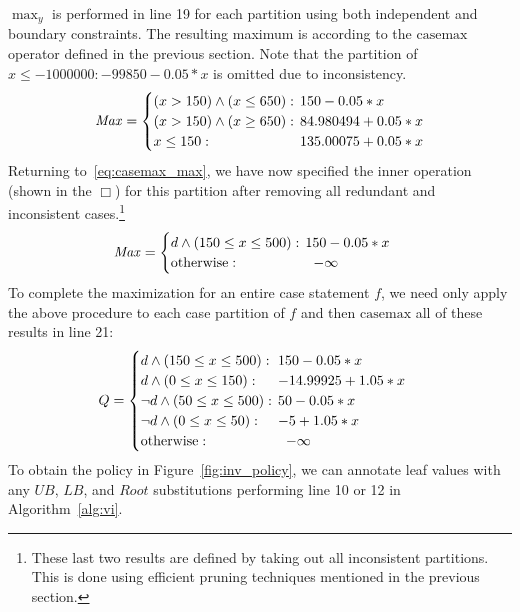 \documentclass[twoside,11pt]{article}
\newcommand{\casemax}{\mathrm{casemax}}
\newcommand{\UB}{\mathit{UB}}
\newcommand{\LB}{\mathit{LB}}
\newcommand{\Root}{\mathit{Root}}
\newcommand{\Max}{\mathit{Max}}
\newcommand{\sqm}{\hspace{-2mm}}
\begin{document}
$\max_y$ is performed in line 19 for each partition using both independent and boundary constraints. The resulting maximum is according to the $\casemax$ operator defined in the previous section. Note that the partition of $x \leq -1000000:  -99850 -0.05 * x$ is omitted due to inconsistency.
{%
\begin{align*}
\Max = 
\begin{cases}
(x > 150) \land (x \leq 650):    & \sqm 150 - 0.05 * x \\ 
(x > 150) \land (x \geq 650):    & \sqm 84.980494 + 0.05 * x \\ 
x \leq 150: & \sqm 135.00075 + 0.05 * x\\ 
\end{cases}
\end{align*}}
Returning to~\eqref{eq:casemax_max}, we have now specified the inner operation (shown in the $\Box$) for this partition after removing all redundant and inconsistent cases.\footnote{ These last two results are defined by taking out all inconsistent partitions. This is done using efficient pruning techniques mentioned in the previous section.}
\begin{align*}
\Max & = 
\begin{cases}
d \land (150 \leq x \leq 500):    & \sqm 150 - 0.05 * x \\ 
\text{\normalsize otherwise} : & -\infty\\ 
\end{cases}
\end{align*}
To complete the maximization for an entire case statement $f$, we need only apply the above procedure to each case partition of $f$ and then $\casemax$ all of these results in line 21: 
\begin{align*}
Q & = 
\begin{cases}
d \land (150 \leq x \leq 500):    & \sqm 150 - 0.05 * x \\ 
d \land (0 \leq x \leq 150):    & \sqm -14.99925 + 1.05 * x \\ 
\neg d \land (50 \leq x \leq 500):    & \sqm 50 - 0.05 * x \\ 
\neg d \land (0 \leq x \leq 50):    & \sqm -5 + 1.05 * x \\ 
\text{\normalsize otherwise} : & -\infty\\ 
\end{cases}
\end{align*}
To obtain the policy in Figure~\ref{fig:inv_policy}, 
we can annotate leaf values with any 
$\UB$, $\LB$, and $\Root$ substitutions performing line 10 or 12 in Algorithm~\ref{alg:vi}.
\end{document}
